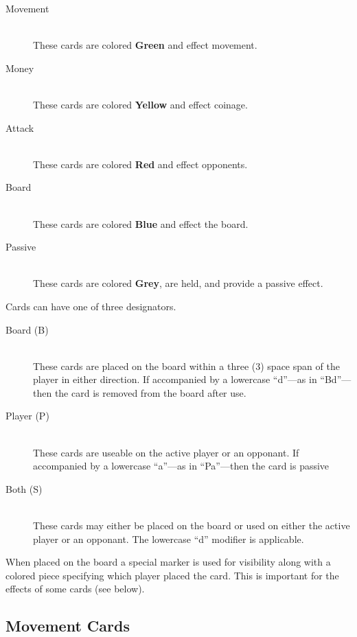 \documentclass{article}
\begin{document}
\begin{description}
\item[Movement]~\\
These cards are colored \textbf{Green} and effect movement.

\item[Money]~\\
These cards are colored \textbf{Yellow} and effect coinage.

\item[Attack]~\\
These cards are colored \textbf{Red} and effect opponents.

\item[Board]~\\
These cards are colored \textbf{Blue} and effect the board.

\item[Passive]~\\
These cards are colored \textbf{Grey}, are held, and provide
a passive effect.
\end{description}

\noindent
Cards can have one of three designators.

\begin{description}
\item[Board (B)]~\\
These cards are placed on the board within a three (3) space span
of the player in either direction.  If accompanied by a lowercase
``d''---as in ``Bd''---then the card is removed from the board after use.

\item[Player (P)]~\\
These cards are useable on the active player or an opponant.
If accompanied by a lowercase ``a''---as in ``Pa''---then the card is passive

\item[Both (S)]~\\
These cards may either be placed on the board or used on either
the active player or an opponant. The lowercase ``d'' modifier is applicable.
\end{description}


\noindent
When placed on the board a special marker is used for visibility along with a
colored piece specifying which player placed the card.  This is important for
the effects of some cards (see below).

\subsection{Movement Cards}
\end{document}
